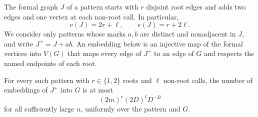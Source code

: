 The formal graph $J$ of a pattern starts with $r$ disjoint root edges and
adds two edges and one vertex at each non-root call. In particular,
\[
 v(J)=2r+\ell,\qquad e(J)=r+2\ell.
\]
We consider only patterns whose marks $a,b$ are distinct and nonadjacent
in $J$, and write $J^+=J+ab$. An embedding below is an injective map of
the formal vertices into $V(G)$ that maps every edge of $J^+$ to an edge
of $G$ and respects the named endpoints of each root.

\begin{lemma}\label{lem:embeddings}
For every such pattern with $r\in\{1,2\}$ roots and $\ell$ non-root calls,
the number of embeddings of $J^+$ into $G$ is at most
\begin{equation}\label{eq:embedding-bound}
 (2m)^r(2D)^\ell D^{-B}
\end{equation}
for all sufficiently large $n$, uniformly over the pattern and $G$.
\end{lemma}

